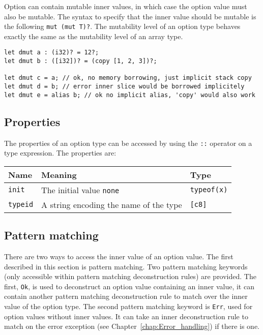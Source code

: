 Option can contain mutable inner values, in which case the option value must
also be mutable. The syntax to specify that the inner value should be mutable is
the following \texttt{mut (mut T)?}. The mutability level of an option type
behaves exactly the same as the mutability level of an array type.

\begin{lstlisting}[style=coloredverbatim]
let dmut a : (i32)? = 12?;
let dmut b : ([i32])? = (copy [1, 2, 3])?;

let dmut c = a; // ok, no memory borrowing, just implicit stack copy
let dmut d = b; // error inner slice would be borrowed implicitely
let dmut e = alias b; // ok no implicit alias, 'copy' would also work
\end{lstlisting}

\subsection{Properties}

The properties of an option type can be accessed by using the \texttt{::} operator on a type expression. The properties are:

\begin{center}\begin{adjustbox}{max width=\linewidth}
  \begin{tabular}{|l|ll|}
    \hline
    Name & Meaning & Type\\
    \hline
    \hline
    \texttt{init} & The initial value \texttt{none} & \texttt{typeof(x)}\\
    \hline
    \texttt{typeid} & A string encoding the name of the type & \texttt{[c8]} \\
    \hline
  \end{tabular}
\end{adjustbox}\end{center}

\subsection{Pattern matching}

There are two ways to access the inner value of an option value. The first
described in this section is pattern matching. Two pattern matching keywords
(only accessible within pattern matching deconstruction rules) are provided. The
first, \texttt{Ok}, is used to deconstruct an option value containing an inner
value, it can contain another pattern matching deconstruction rule to match over
the inner value of the option type. The second pattern matching keyword is
\texttt{Err}, used for option values without inner values. It can take an inner
deconstruction rule to match on the error exception (see
Chapter~\ref{chap:Error_handling}) if there is one.

